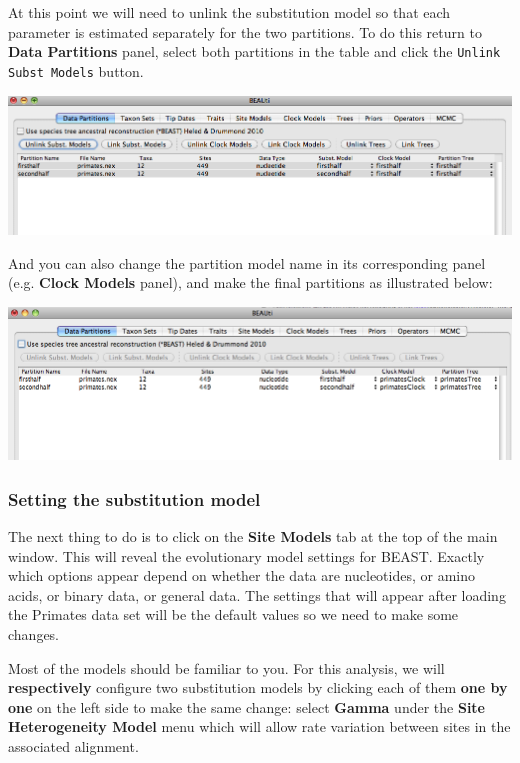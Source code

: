 \documentclass[12pt]{article}
\begin{document}
At this point we will need to unlink the substitution model so that each parameter is estimated separately for the two partitions. To do this return to {\bf Data Partitions} panel, select both partitions in the table and click the \texttt{Unlink Subst Models} button. 

\medskip{}

\includegraphics[scale=0.4]{figures/BEAUti_Unlink}

\medskip{}

And you can also change the partition model name in its corresponding panel (e.g. {\bf Clock Models}  panel), and make the final partitions as illustrated below:

\medskip{}

\includegraphics[scale=0.4]{figures/BEAUti_DataPartitions_final}

\medskip{}



\subsubsection*{Setting the substitution model}

The next thing to do is to click on the {\bf Site Models} tab at the top of the
main window. This will reveal the evolutionary model settings for
BEAST. Exactly which options appear depend on whether the data are
nucleotides, or amino acids, or binary data, or general data.
The settings that will appear after loading the Primates data set will
be the default values so we need to make some changes. 

Most of the models should be familiar to you. For this analysis, we
will \textbf{respectively} configure two substitution models by clicking each of them \textbf{one by one} on the 
left side to make the same change: select \textbf{Gamma} under the 
\textbf{Site Heterogeneity Model} menu which will allow rate variation 
between sites in the associated alignment. 
\end{document}
